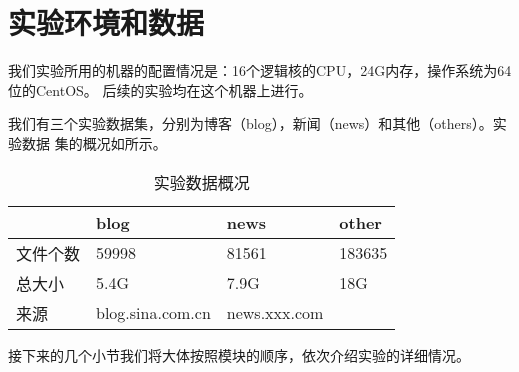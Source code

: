\section{实验环境和数据}
\label{sec:dataenv}
我们实验所用的机器的配置情况是：16个逻辑核的CPU，24G内存，操作系统为64位的CentOS。
后续的实验均在这个机器上进行。

我们有三个实验数据集，分别为博客（blog），新闻（news）和其他（others）。实验数据
集的概况如所示。%
\begin{table}[h]
  \centering
\begin{tabular}{llll}
\toprule
 & blog & news & other \\
\hline
文件个数 & 59998 & 81561 & 183635 \\
总大小 & 5.4G & 7.9G & 18G \\
来源 & blog.sina.com.cn &  news.xxx.com &  \\
\bottomrule
\end{tabular}
  \caption{实验数据概况}
  \label{experiment:tab:overview}
\end{table}
\begin{comment}
#+ORGTBL: SEND 实验数据概况 orgtbl-to-latex :splice nil :skip 0
|          | blog             | news  | other  |
|----------+------------------+-------+--------|
| 文件个数 | 59998            | 81561 | 183635 |
| 总大小   | 5.4G             | 7.9G  | 18G    |
| 来源     | blog.sina.com.cn |       |        |
\end{comment}

接下来的几个小节我们将大体按照模块的顺序，依次介绍实验的详细情况。
\label{sec:results}

